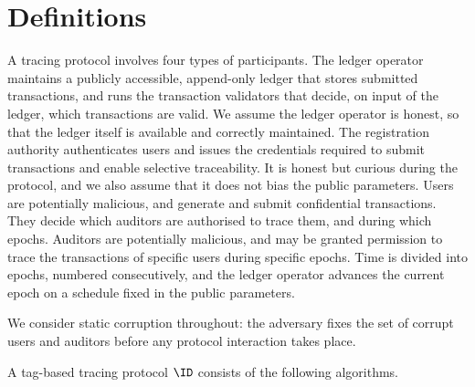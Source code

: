 \section{Definitions}\label{sec:txid-definitions}

A tracing protocol involves four types of participants. The ledger operator
maintains a publicly accessible, append-only ledger that stores submitted
transactions, and runs the transaction validators that decide, on input of the
ledger, which transactions are valid. We assume the ledger operator is honest,
so that the ledger itself is available and correctly maintained. The
registration authority authenticates users and issues the credentials required
to submit transactions and enable selective traceability. It is honest but curious during the protocol, and we also assume that it does
not bias the public parameters. Users are potentially malicious, and generate and submit
confidential transactions. They decide which auditors are authorised to trace
them, and during which epochs. Auditors are
potentially malicious, and may be granted permission to trace the transactions
of specific users during specific epochs. Time is divided into epochs, numbered
consecutively, and the ledger operator advances the current epoch on a schedule
fixed in the public parameters.

We consider static corruption throughout: the adversary fixes the set of
corrupt users and auditors before any protocol interaction takes place.

A tag-based tracing protocol $\ID$ consists of the following algorithms.

